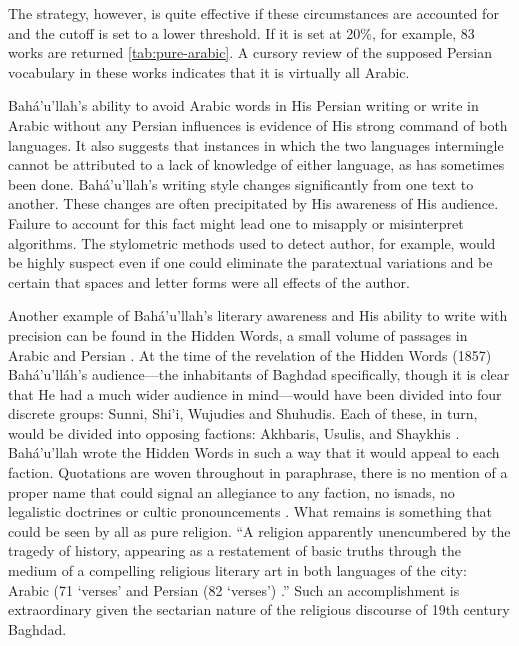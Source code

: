 \documentclass[12pt, oneside]{report}
\begin{document}
The strategy, however, is quite effective if these circumstances are accounted for and the cutoff is set to a lower threshold.
If it is set at 20\%, for example, 83 works are returned \ref{tab:pure-arabic}.
A cursory review of the supposed Persian vocabulary in these works indicates that it is virtually all Arabic.
\par
Bah\'{a}'u'llah's ability to avoid Arabic words in His Persian writing or write in Arabic without any Persian influences is evidence of His strong command of both languages.
It also suggests that instances in which the two languages intermingle cannot be attributed to a lack of knowledge of either language, as has sometimes been done.
Bah\'{a}'u'llah's writing style changes significantly from one text to another.
These changes are often precipitated by His awareness of His audience.
Failure to account for this fact might lead one to misapply or misinterpret algorithms.
The stylometric methods used to detect author, for example, would be highly suspect even if one could eliminate the paratextual variations and be certain that spaces and letter forms were all effects of the author.
\par
Another example of Bah\'{a}'u'llah's literary awareness and His ability to write with precision can be found in the Hidden Words, a small volume of passages in Arabic and Persian \cite{bahaullah_hidden_2002}.
At the time of the revelation of the Hidden Words (1857) Bahá'u'lláh's audience–--the inhabitants of Baghdad specifically, though it is clear that He had a much wider audience in mind–--would have been divided into four discrete groups: Sunni, Shi'i, Wujudies and Shuhudis.
Each of these, in turn, would be divided into opposing factions: Akhbaris, Usulis, and Shaykhis \cite{lawson_todd_globalization_2005}.
Bah\'{a}'u'llah wrote the Hidden Words in such a way that it would appeal to each faction.
Quotations are woven throughout in paraphrase, there is no mention of a proper name that could signal an allegiance to any faction, no isnads, no legalistic doctrines or cultic pronouncements \cite{lawson_todd_globalization_2005}.
What remains is something that could be seen by all as pure religion.
``A religion apparently unencumbered by the tragedy of history, appearing as a restatement of basic truths through the medium of a compelling religious literary art in both languages of the city: Arabic (71 `verses' and Persian (82 `verses') \cite{lawson_todd_globalization_2005}.''
Such an accomplishment is extraordinary given the sectarian nature of the religious discourse of 19th century Baghdad.
\end{document}

